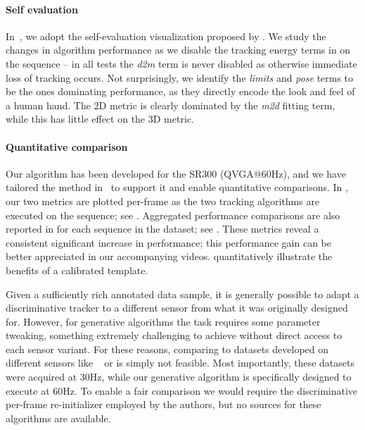 \paragraph{Self evaluation}
% 
In~, we adopt the self-evaluation visualization proposed by \cite{taylor2016concerto}. We study the changes in algorithm performance as we disable the tracking energy terms in  on the  sequence -- in all tests the \emph{d2m} term is never disabled as otherwise immediate loss of tracking occurs. Not surprisingly, we identify the \emph{limits} and \emph{pose} terms to be the ones dominating performance, as they directly encode the look and feel of a human hand. The 2D metric is clearly dominated by the \emph{m2d} fitting term, while this has little effect on the 3D metric. 
% 



\paragraph{Quantitative comparison}
Our algorithm has been developed for the \realsense{} SR300 (QVGA@60Hz), and we have tailored the method in~\cite{tagliasacchi2015robust} to support it and enable quantitative comparisons. In , our two metrics are plotted per-frame as the two tracking algorithms are executed on the  sequence; see . Aggregated performance comparisons are also reported in  for each sequence in the \handy{} dataset; see . These metrics reveal a consistent significant increase in performance; this performance gain can be better appreciated in our accompanying videos.  quantitatively illustrate the benefits of a calibrated template.

Given a sufficiently rich annotated data sample, it is generally possible to adapt a discriminative tracker to a different sensor from what it was originally designed for. However, for generative algorithms the task requires some parameter tweaking, something extremely challenging to achieve without direct access to each sensor variant. For these reasons, comparing to datasets developed on different sensors like \dexter{}~\cite{sridhar2013multicam} or \fingerpaint{} \cite{sharp2015accurate} is simply not feasible. Most importantly, these datasets were acquired at 30Hz, while our generative algorithm is specifically designed to execute at 60Hz. To enable a fair comparison we would require the discriminative per-frame re-initializer employed by the authors, but no sources for these algorithms are available.


